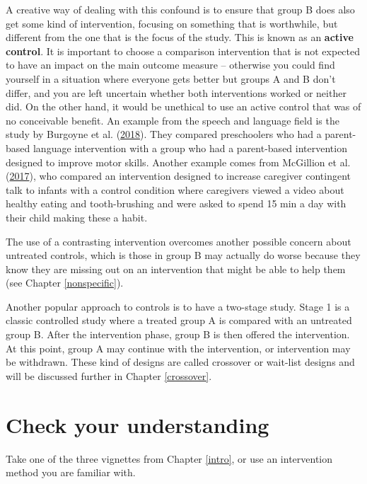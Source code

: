 \documentclass{krantz}
\begin{document}
A creative way of dealing with this confound is to ensure that group B does also get some kind of intervention, focusing on something that is worthwhile, but different from the one that is the focus of the study. This is known as an \textbf{active control}. It is important to choose a comparison intervention that is not expected to have an impact on the main outcome measure -- otherwise you could find yourself in a situation where everyone gets better but groups A and B don't differ, and you are left uncertain whether both interventions worked or neither did. On the other hand, it would be unethical to use an active control that was of no conceivable benefit. An example from the speech and language field is the study by Burgoyne et al. (\protect\hyperlink{ref-burgoyne2018}{2018}). They compared preschoolers who had a parent-based language intervention with a group who had a parent-based intervention designed to improve motor skills. Another example comes from McGillion et al. (\protect\hyperlink{ref-mcgillion2017}{2017}), who compared an intervention designed to increase caregiver contingent talk to infants with a control condition where caregivers viewed a video about healthy eating and tooth-brushing and were asked to spend 15 min a day with their child making these a habit.

The use of a contrasting intervention overcomes another possible concern about untreated controls, which is those in group B may actually do worse because they know they are missing out on an intervention that might be able to help them (see Chapter \ref{nonspecific}).

Another popular approach to controls is to have a two-stage study. Stage 1 is a classic controlled study where a treated group A is compared with an untreated group B. After the intervention phase, group B is then offered the intervention. At this point, group A may continue with the intervention, or intervention may be withdrawn. These kind of designs are called crossover or wait-list designs and will be discussed further in Chapter \ref{crossover}.

\hypertarget{check-your-understanding-5}{%
\section{Check your understanding}\label{check-your-understanding-5}}

Take one of the three vignettes from Chapter \ref{intro}, or use an intervention method you are familiar with.
\end{document}
